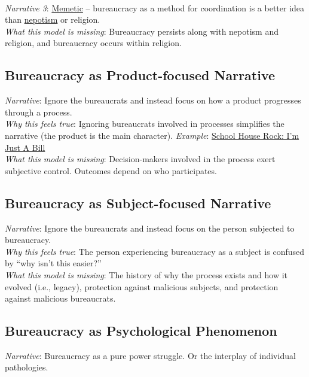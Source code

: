 \ \\
\textit{Narrative 3}: \href{https://en.wikipedia.org/wiki/Memetics}{Memetic}
-- bureaucracy as a method for coordination is a better idea than \href{https://en.wikipedia.org/wiki/Nepotism}{nepotism} 
or religion. \\
\textit{What this model is missing}: Bureaucracy persists along with nepotism and religion, and bureaucracy occurs within religion. 

\subsection*{Bureaucracy as Product-focused Narrative}
\textit{Narrative}: Ignore the bureaucrats and instead focus on how a product progresses through a process.\\
\textit{Why this feels true}: Ignoring bureaucrats involved in processes simplifies the narrative (the product is the main character). 
\textit{Example}: \href{https://www.youtube.com/watch?v=OgVKvqTItto}{School House Rock: I'm Just A Bill}\\
\textit{What this model is missing}: Decision-makers involved in the process exert subjective control. Outcomes depend on who participates. 

\subsection*{Bureaucracy as Subject-focused Narrative}
\textit{Narrative}: Ignore the bureaucrats and instead focus on the person subjected to bureaucracy. \\
\textit{Why this feels true}: The person experiencing bureaucracy as a subject is confused by ``why isn't this easier?''  \\
\textit{What this model is missing}: The history of why the process exists and how it evolved (i.e., legacy), protection against malicious subjects, and protection against malicious bureaucrats. 


\subsection*{Bureaucracy as Psychological Phenomenon}

\textit{Narrative}: Bureaucracy as a pure power struggle. Or the interplay of individual pathologies. 

